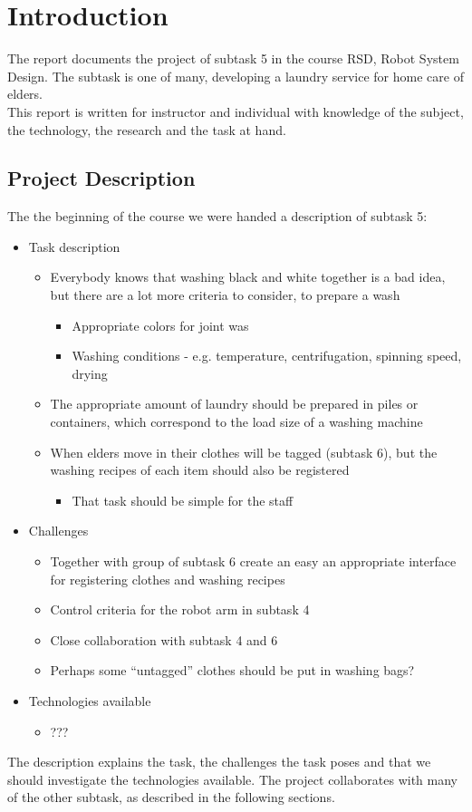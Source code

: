 \section{Introduction}

The report documents the project of subtask 5 in the course RSD, Robot System Design. The subtask is one of many, developing a laundry service for home care of elders. \\ This report is written for instructor and individual with knowledge of the subject, the technology, the research and the task at hand.

\subsection{Project Description}

The the beginning of the course we were handed a description of subtask 5:

\begin{itemize}
\item Task description
	\begin{itemize}
	\item Everybody knows that washing black and white together is a bad idea, but there are a lot more criteria to consider, to prepare a wash
		\begin{itemize}
		\item Appropriate colors for joint was
		\item Washing conditions - e.g. temperature, centrifugation, spinning speed, drying
		\end{itemize}
	\item The appropriate amount of laundry should be prepared in piles or containers, which correspond to the load size of a washing machine
	\item When elders move in their clothes will be tagged (subtask 6), but the washing recipes of each item should also be registered
		\begin{itemize}
		\item That task should be simple for the staff
		\end{itemize}
	\end{itemize}
\item Challenges
	\begin{itemize}
	\item Together with group of subtask 6 create an easy an appropriate interface for registering clothes and washing recipes
	\item Control criteria for the robot arm in subtask 4
	\item Close collaboration with subtask 4 and 6
	\item Perhaps some “untagged” clothes should be put in washing bags?
	\end{itemize}
\item Technologies available
	\begin{itemize}
	\item ???
	\end{itemize}
\end{itemize}

The description explains the task, the challenges the task poses and that we should investigate the technologies available. The project collaborates with many of the other subtask, as described in the following sections.